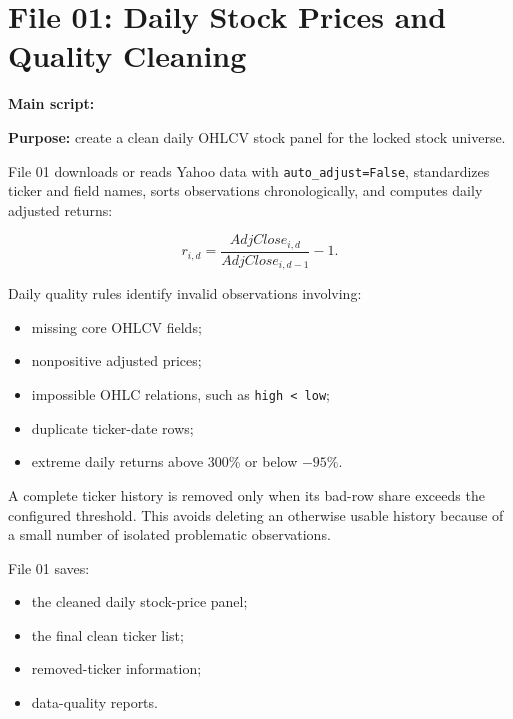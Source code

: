 \documentclass[11pt,a4paper]{article}
\newcommand{\code}[1]{\texttt{#1}}
\begin{document}
\section{File 01: Daily Stock Prices and Quality Cleaning}

\textbf{Main script:}

\begin{center}
\end{center}

\textbf{Purpose:} create a clean daily OHLCV stock panel for the locked stock
universe.

File 01 downloads or reads Yahoo data with \code{auto\_adjust=False},
standardizes ticker and field names, sorts observations chronologically, and
computes daily adjusted returns:

\[
  r_{i,d}
  =
  \frac{AdjClose_{i,d}}
       {AdjClose_{i,d-1}}
  -1.
\]

Daily quality rules identify invalid observations involving:

\begin{itemize}
  \item missing core OHLCV fields;
  \item nonpositive adjusted prices;
  \item impossible OHLC relations, such as \code{high < low};
  \item duplicate ticker-date rows;
  \item extreme daily returns above 300\% or below \(-95\%\).
\end{itemize}

A complete ticker history is removed only when its bad-row share exceeds the
configured threshold. This avoids deleting an otherwise usable history because
of a small number of isolated problematic observations.

File 01 saves:

\begin{itemize}
  \item the cleaned daily stock-price panel;
  \item the final clean ticker list;
  \item removed-ticker information;
  \item data-quality reports.
\end{itemize}

\end{document}
